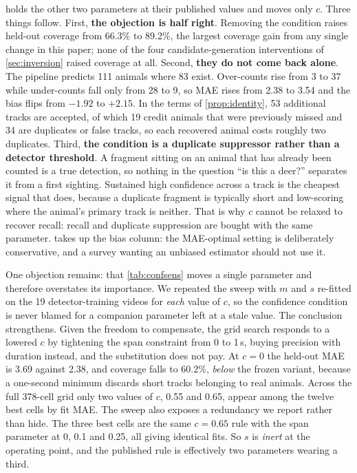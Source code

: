  holds the other two parameters at their published values and moves
only $c$. Three things follow. First, \textbf{the objection is half right}. Removing the
condition raises held-out coverage from 66.3\% to 89.2\%, the largest coverage gain from any
single change in this paper; none of the four candidate-generation interventions of
\cref{sec:inversion} raised coverage at all. Second, \textbf{they do not come back alone}. The pipeline
predicts 111 animals where 83 exist. Over-counts rise from 3 to 37 while under-counts fall
only from 28 to 9, so MAE rises from 2.38 to 3.54 and the bias flips from $-1.92$ to
$+2.15$. In the terms of \cref{prop:identity}, 53 additional tracks are accepted, of which
19 credit animals that were previously missed and 34 are duplicates or false tracks, so
each recovered animal costs roughly two duplicates. Third, \textbf{the condition is a
duplicate suppressor rather than a detector threshold}. A fragment sitting on an animal
that has already been counted is a true detection, so nothing in the question ``is this a
deer?'' separates it from a first sighting. Sustained high confidence across a track is the
cheapest signal that does, because a duplicate fragment is typically short and low-scoring
where the animal's primary track is neither. That is why $c$ cannot be relaxed to recover
recall: recall and duplicate suppression are bought with the same parameter.  takes up the bias column: the MAE-optimal setting is deliberately conservative, and a survey wanting an unbiased estimator should not use it.

One objection remains: that \cref{tab:confsens} moves a single parameter and therefore
overstates its importance. We repeated the sweep with $m$ and $s$ re-fitted on the 19
detector-training videos for \emph{each} value of $c$, so the confidence condition is never
blamed for a companion parameter left at a stale value. The conclusion strengthens. Given
the freedom to compensate, the grid search responds to a lowered $c$ by tightening the span
constraint from 0 to 1\,s, buying precision with duration instead, and the substitution
does not pay. At $c=0$ the held-out MAE is 3.69 against 2.38, and coverage falls to
60.2\%, \emph{below} the frozen variant, because a one-second minimum discards short tracks
belonging to real animals. Across the full 378-cell grid only two values of $c$, 0.55 and
0.65, appear among the twelve best cells by fit MAE. The sweep also exposes a redundancy we
report rather than hide. The three best cells are the same $c=0.65$ rule with the span
parameter at 0, 0.1 and 0.25, all giving identical fits. So $s$ is \emph{inert} at the operating point, and the published rule is effectively two parameters wearing a third.

